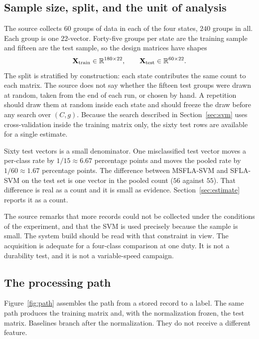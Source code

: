 \subsection{Sample size, split, and the unit of analysis}

The source collects \(60\) groups of data in each of the four states, \(240\) groups in all.
Each group is one \(22\)-vector.
Forty-five groups per state are the training sample and fifteen are the test sample, so the design matrices have shapes
\begin{equation}
\mathbf{X}_{\mathrm{train}}\in\mathbb{R}^{180\times 22},
\qquad
\mathbf{X}_{\mathrm{test}}\in\mathbb{R}^{60\times 22}.
\label{eq:shapes}
\end{equation}
The split is stratified by construction: each state contributes the same count to each matrix.
The source does not say whether the fifteen test groups were drawn at random, taken from the end of each run, or chosen by hand.
A repetition should draw them at random inside each state and should freeze the draw before any search over \((C, g)\).
Because the search described in Section~\ref{sec:svm} uses cross-validation inside the training matrix only, the sixty test rows are available for a single estimate.

Sixty test vectors is a small denominator.
One misclassified test vector moves a per-class rate by \(1/15\approx 6.67\) percentage points and moves the pooled rate by \(1/60\approx 1.67\) percentage points.
The difference between MSFLA-SVM and SFLA-SVM on the test set is one vector in the pooled count (\(56\) against \(55\)).
That difference is real as a count and it is small as evidence.
Section~\ref{sec:estimate} reports it as a count.

The source remarks that more records could not be collected under the conditions of the experiment, and that the SVM is used precisely because the sample is small.
The system build should be read with that constraint in view.
The acquisition is adequate for a four-class comparison at one duty.
It is not a durability test, and it is not a variable-speed campaign.

\subsection{The processing path}

Figure~\ref{fig:path} assembles the path from a stored record to a label.
The same path produces the training matrix and, with the normalization frozen, the test matrix.
Baselines branch after the normalization.
They do not receive a different feature.

